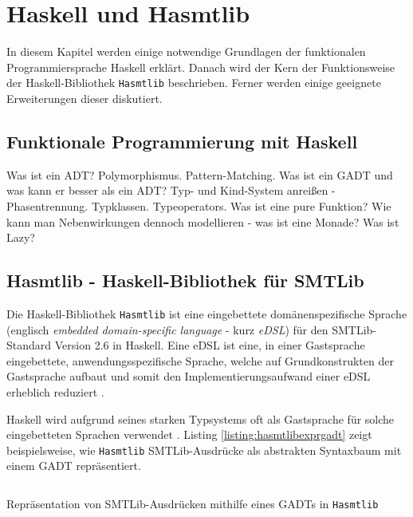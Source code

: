 \chapter{Haskell und Hasmtlib}
\label{chapter:haskell}
In diesem Kapitel werden einige notwendige Grundlagen der funktionalen Programmiersprache Haskell erklärt.
Danach wird der Kern der Funktionsweise der Haskell-Bibliothek \texttt{Hasmtlib} \cite{hasmtlib} beschrieben.
Ferner werden einige geeignete Erweiterungen dieser diskutiert.

\section{Funktionale Programmierung mit Haskell}
\label{sec:haskell}
Was ist ein ADT?
Polymorphismus.
Pattern-Matching.
Was ist ein GADT und was kann er besser als ein ADT?
Typ- und Kind-System anreißen - Phasentrennung.
Typklassen.
Typeoperators.
Was ist eine pure Funktion?
Wie kann man Nebenwirkungen dennoch modellieren - was ist eine Monade?
Was ist Lazy?

\section{Hasmtlib - Haskell-Bibliothek für SMTLib}
\label{sec:hasmtlib}
Die Haskell-Bibliothek \texttt{Hasmtlib} \cite{hasmtlib} ist eine eingebettete domänenspezifische Sprache
(englisch \textit{embedded domain-specific language} - kurz \textit{eDSL}) für den SMTLib-Standard Version 2.6 \cite{smtlib} in Haskell.
Eine eDSL ist eine, in einer Gastsprache eingebettete, anwendungsspezifische Sprache, welche auf Grundkonstrukten der Gastsprache aufbaut und somit den
Implementierungsaufwand einer eDSL erheblich reduziert \cite{eDSL}.

Haskell wird aufgrund seines starken Typsystems oft als Gastsprache für solche eingebetteten Sprachen verwendet \cite{eDSL2}.
Listing \ref{listing:hasmtlibexprgadt} zeigt beispielsweise, wie \texttt{Hasmtlib} SMTLib-Ausdrücke als abstrakten Syntaxbaum mit einem GADT repräsentiert.

\begin{listing}[H]
    \inputminted[linenos=true]{haskell}{Code/Implementierung/Hasmtlib/ExprGADT.hs}
    \caption{Repräsentation von SMTLib-Ausdrücken mithilfe eines GADTs in \texttt{Hasmtlib} \cite{hasmtlibExpr}}
    \label{listing:hasmtlibexprgadt}
\end{listing}

